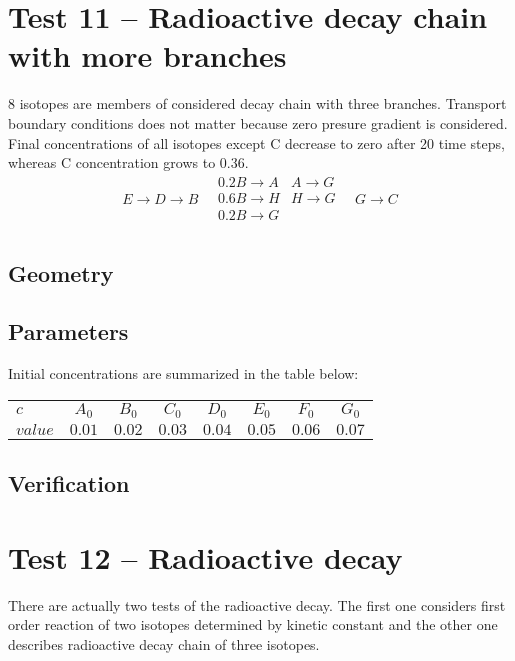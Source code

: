 
\section{Test 11 -- Radioactive decay chain with more branches}
8 isotopes are members of considered decay chain with three branches. Transport boundary conditions does not matter because zero presure gradient is considered. Final concentrations of all isotopes except C decrease to zero after 20 time steps, whereas C concentration grows to 0.36.
\[
 E\xrightarrow{}D\xrightarrow{}B
 \quad
 \begin{matrix}
    0.2B\xrightarrow{}A & A\xrightarrow{}G \\
    0.6B\xrightarrow{}H & H\xrightarrow{}G \\
    0.2B\xrightarrow{}G &\\
 \end{matrix}
 \quad
 G\xrightarrow{}C 
\]

\subsection*{Geometry}

\subsection*{Parameters}
Initial concentrations are summarized in the table below:
\begin{center}
  \begin{tabular}[c]{|l|c|c|c|c|c|c|c|}
      \hline
      $c$ & $A_0$ & $B_0$  & $C_0$ & $D_0$ & $E_0$ & $F_0$ & $G_0$ \\[4pt]
      $value$ & $0.01$ & $0.02$ & $0.03$ & $0.04$ & $0.05$ & $0.06$ & $0.07$\\[4pt]
      \hline
  \end{tabular}
\end{center}

\subsection*{Verification}



\section{Test 12 -- Radioactive decay}
There are actually two tests of the radioactive decay. The first one considers first order reaction of two isotopes determined by kinetic constant and the other one describes radioactive decay chain of three isotopes.

